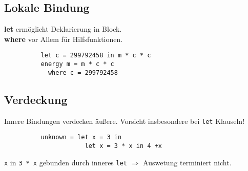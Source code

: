 \documentclass[10pt,a4paper]{article}
\def\code#1{\texttt{#1}}
\begin{document}
        \subsection{Lokale Bindung}
        \textbf{let} ermöglicht Deklarierung in Block.\\
        \textbf{where} vor Allem für Hilfsfunktionen.\\
        \begin{lstlisting}
          let c = 299792458 in m * c * c
          energy m = m * c * c
            where c = 299792458
        \end{lstlisting}

        \subsection{Verdeckung}
        Innere Bindungen verdecken äußere.
        Vorsicht insbesondere bei \code{let} Klauseln!
        \begin{lstlisting}
          unknown = let x = 3 in
                      let x = 3 * x in 4 +x
        \end{lstlisting}
        \code{x} in \code{3 * x} gebunden durch inneres \code{let}
        \(\Rightarrow\) Auswetung terminiert nicht.
        
\end{document}
